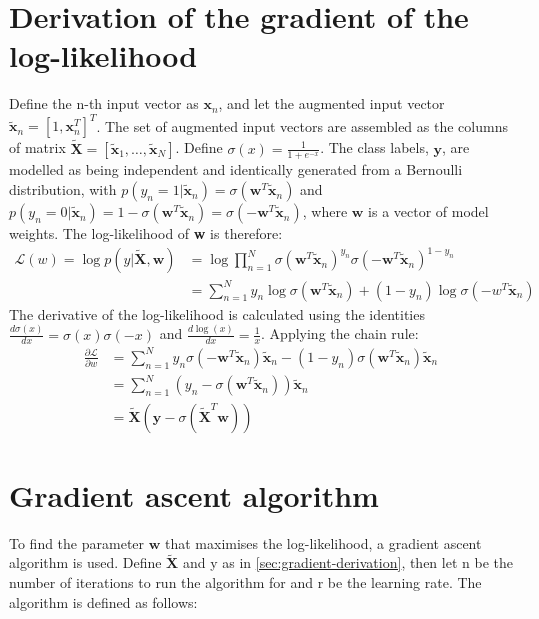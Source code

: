 \documentclass[a4paper]{article}
\begin{document}
    \section{Derivation of the gradient of the log-likelihood}\label{sec:gradient-derivation}
    Define the n-th input vector as $\textbf{x}_n$, and let the augmented input vector
    $\tilde{\textbf{x}}_n = \left[1, \textbf{x}_n^T \right]^T$.
    The set of augmented input vectors are assembled as the columns of matrix
    $\tilde{\textbf{X}} = [\tilde{\textbf{x}}_1, \dots, \tilde{\textbf{x}}_N]$.
    Define $\sigma(x) = \frac{1}{1 + e^{-x}}$.
    The class labels, $\textbf{y}$, are modelled as being independent and identically generated from a Bernoulli
    distribution, with $p (y_n = 1 | \tilde{\textbf{x}}_n ) = \sigma (\textbf{w}^T\tilde{\textbf{x}}_n)$ and
    $p (y_n = 0 | \tilde{\textbf{x}}_n ) = 1 - \sigma (\textbf{w}^T\tilde{\textbf{x}}_n) = \sigma (-\textbf{w}^T\tilde{\textbf{x}}_n)$,
    where $\textbf{w}$ is a vector of model weights.
    The log-likelihood of \textbf{w} is therefore:
    \begin{align*}
        \mathcal{L}(w) = \log p(y|\tilde{\textbf{X}}, \textbf{w})
        &= \log \prod_{n=1}^{N} \sigma( \textbf{w}^T \tilde{\textbf{x}}_n)^{y_n}
        \sigma (-\textbf{w}^T \tilde{\textbf{x}}_n)^{1-y_n} \\
        &= \sum_{n=1}^{N} y_n \log\sigma( \textbf{w}^T \tilde{\textbf{x}}_n) + (1-y_n) \log\sigma(-w^T \tilde{\textbf{x}}_n)
    \end{align*}
    The derivative of the log-likelihood is calculated using the identities $\frac{d\sigma(x)}{dx} = \sigma(x)\sigma(-x)$
    and $\frac{d\log(x)}{dx} = \frac{1}{x}$. Applying the chain rule:
    \begin{align*}
        \frac{\partial \mathcal{L}}{\partial w}
        &= \sum_{n=1}^{N} y_n \sigma(-\textbf{w}^T \tilde{\textbf{x}}_n) \tilde{\textbf{x}}_n - (1-y_n) \sigma(\textbf{w}^T \tilde{\textbf{x}}_n)  \tilde{\textbf{x}}_n \\
        &= \sum_{n=1}^{N} \left(y_n - \sigma(\textbf{w}^T \tilde{\textbf{x}}_n) \right)  \tilde{\textbf{x}}_n \\
        &= \tilde{\textbf{X}} (\textbf{y} - \sigma(\tilde{\textbf{X}}^T \textbf{w}))
    \end{align*}

    \section{Gradient ascent algorithm}\label{sec:gradient-ascent-algorithm}
    To find the parameter $\textbf{w}$ that maximises the log-likelihood, a gradient ascent algorithm is used. Define
    $\tilde{\textbf{X}}$ and y as in \autoref{sec:gradient-derivation}, then let n be the number of iterations to run the
    algorithm for and r be the learning rate. The algorithm is defined as follows:
\end{document}
